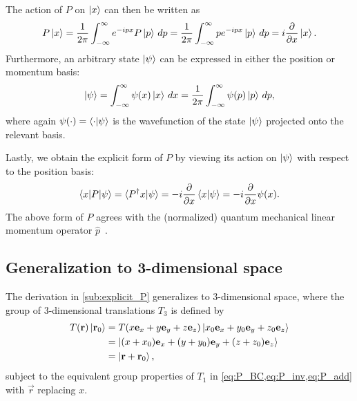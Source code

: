 The action of $P$ on $\ket{x}$ can then be written as
\begin{align}
    P\ket{x} = \frac{1}{2\pi}\int_{-\infty}^{\infty} e^{-ipx}P\ket{p} \,dp = \frac{1}{2\pi}\int_{-\infty}^{\infty} p e^{-ipx}\ket{p} \,dp = i\frac{\partial}{\partial x}\ket{x}.
\end{align}
Furthermore, an arbitrary state $\ket{\psi}$ can be expressed in either the position or momentum basis:
\begin{align}
    \ket{\psi} = \int_{-\infty}^{\infty} \psi(x)\ket{x} \,dx = \frac{1}{2\pi}\int_{-\infty}^{\infty} \psi(p)\ket{p} \,dp,
\end{align}
where again $\psi(\cdot) = \braket{\cdot|\psi}$ is the wavefunction of the state $\ket{\psi}$ projected onto the relevant basis.

Lastly, we obtain the explicit form of $P$ by viewing its action on $\ket{\psi}$ with respect to the position basis:
\begin{align}
    \braket{x|P|\psi} = \braket{P^\dagger x|\psi} = -i\frac{\partial}{\partial x}\braket{x|\psi} = -i\frac{\partial}{\partial x}\psi(x).
\end{align}
The above form of $P$ agrees with the (normalized) quantum mechanical linear momentum operator $\hat{p}$~\cite{Hall2013,Griffiths2018}.

\subsection{Generalization to 3-dimensional space}\label{sub:3D_translations}
The derivation in \cref{sub:explicit_P} generalizes to 3-dimensional space, where the group of 3-dimensional translations $T_3$ is defined by
\begin{align}
    \begin{split}        
    T(\mathbf{r})\ket{\mathbf{r}_0}
        &= T(x\mathbf{e}_x + y\mathbf{e}_y + z\mathbf{e}_z)\ket{x_0\mathbf{e}_x + y_0\mathbf{e}_y + z_0\mathbf{e}_z} \\
        &= \ket{(x + x_0)\mathbf{e}_x + (y + y_0)\mathbf{e}_y + (z + z_0)\mathbf{e}_z} \\
        &= \ket{\mathbf{r}+\mathbf{r}_0},
    \end{split}
\end{align}
subject to the equivalent group properties of $T_1$ in \cref{eq:P_BC,eq:P_inv,eq:P_add} with $\vec{r}$ replacing $x$.

